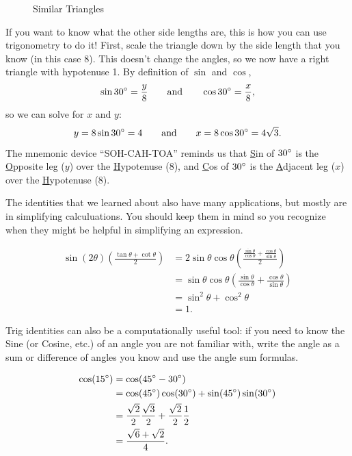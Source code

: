 \begin{exampleblock}[breakable]
\begin{figure}[H]
{\begin{tikzpicture}[x=0.75pt,y=0.75pt,yscale=-1,xscale=1]
\end{tikzpicture}}
\caption{Similar Triangles}
\end{figure}

If you want to know what the other side lengths are, this is how you can use trigonometry to do it! First, scale the triangle down by the side length that you know (in this case $8$). This doesn't change the angles, so we now have a right triangle with hypotenuse 1. By definition of $\sin$ and $\cos$,
$$\sin 30\degree = \frac{y}{8}\quad\quad\text{and}\quad\quad\cos 30\degree=\frac{x}{8},$$
so we can solve for $x$ and $y$:
$$y = 8\sin 30\degree = 4\quad\quad\text{and}\quad\quad x= 8\cos 30\degree= 4\sqrt{3}.$$
The mnemonic device ``SOH-CAH-TOA'' reminds us that \underline{S}in of $30\degree$ is the \underline{O}pposite leg ($y$) over the \underline{H}ypotenuse (8), and \underline{C}os of $30\degree$ is the \underline{A}djacent leg ($x$) over the \underline{H}ypotenuse (8).
\end{exampleblock}

The identities that we learned about also have many applications, but mostly are in simplifying calculuations. You should keep them in mind so you recognize when they might be helpful in simplifying an expression.
\begin{exampleblock}
\begin{align*}
\sin\left(2\theta\right)\left(\frac{\tan \theta+\cot \theta}{2}\right)
& = 2\sin\theta\cos\theta\left(\frac{\frac{\sin\theta}{\cos\theta}+\frac{\cos\theta}{\sin\theta}}{2}\right)\\
& = \sin\theta\cos\theta\left(\frac{\sin\theta}{\cos\theta}+\frac{\cos\theta}{\sin\theta}\right)\\
& = \sin^2\theta+\cos^2\theta\\
& = 1.
\end{align*}
\end{exampleblock}


Trig identities can also be a computationally useful tool: if you need to know the Sine (or Cosine, etc.) of an angle you are not familiar with, write the angle as a sum or difference of angles you know and use the angle sum formulas.
\begin{exampleblock}
\begin{align*}
\cos(15\degree) & = \cos(45\degree-30\degree) \\
                & = \cos(45\degree)\cos(30\degree)+\sin(45\degree)\sin(30\degree) \\
                & = \frac{\sqrt{2}}{2}\frac{\sqrt{3}}{2} + \frac{\sqrt{2}}{2}\frac{1}{2} \\
                & = \frac{\sqrt{6}+\sqrt{2}}{4}.
\end{align*}
\end{exampleblock}

